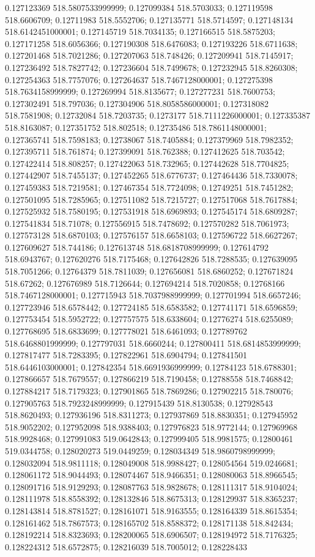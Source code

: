 0.127123369 518.5807533999999; 0.127099384 518.5703033; 0.127119598 518.6606709; 0.12711983 518.5552706; 0.127135771 518.5714597; 0.127148134 518.6142451000001; 0.127145719 518.7034135; 0.127166515 518.5875203; 0.127171258 518.6056366; 0.127190308 518.6476083; 0.127193226 518.6711638; 0.127201468 518.7021286; 0.127207063 518.748426; 0.127209941 518.7145917; 0.127236492 518.7827742; 0.127236604 518.7499678; 0.127232945 518.8260308; 0.127254363 518.7757076; 0.127264637 518.7467128000001; 0.127275398 518.7634158999999; 0.127269994 518.8135677; 0.127277231 518.7600753; 0.127302491 518.797036; 0.127304906 518.8058586000001; 0.127318082 518.7581908; 0.12732084 518.7203735; 0.1273177 518.7111226000001; 0.127335387 518.8163087; 0.127351752 518.802518; 0.12735486 518.7861148000001; 0.127365741 518.7598183; 0.12738067 518.7405884; 0.127379969 518.7982352; 0.127395711 518.761874; 0.127399091 518.762388; 0.127412625 518.703542; 0.127422414 518.808257; 0.127422063 518.732965; 0.127442628 518.7704825; 0.127442907 518.7455137; 0.127452265 518.6776737; 0.127464436 518.7330078; 0.127459383 518.7219581; 0.127467354 518.7724098; 0.12749251 518.7451282; 0.127501095 518.7285965; 0.127511082 518.7215727; 0.127517068 518.7617884; 0.127525932 518.7580195; 0.127531918 518.6969893; 0.127545174 518.6809287; 0.127541834 518.71078; 0.127556915 518.7478692; 0.127570282 518.7061973; 0.127573128 518.6870103; 0.127576157 518.6658103; 0.127596722 518.6627267; 0.127609627 518.744186; 0.127613748 518.6818708999999; 0.127614792 518.6943767; 0.127620276 518.7175468; 0.127642826 518.7288535; 0.127639095 518.7051266; 0.12764379 518.7811039; 0.127656081 518.6860252; 0.127671824 518.67262; 0.127676989 518.7126644; 0.127694214 518.7020858; 0.12768166 518.7467128000001; 0.127715943 518.7037988999999; 0.127701994 518.6657246; 0.127723946 518.6578442; 0.127724185 518.6583582; 0.127741171 518.6596859; 0.127753454 518.5952722; 0.127757575 518.6338604; 0.12776274 518.6255089; 0.127768695 518.6833699; 0.127778021 518.6461093; 0.127789762 518.6468801999999; 0.127797031 518.6660244; 0.127800411 518.6814853999999; 0.127817477 518.7283395; 0.127822961 518.6904794; 0.127841501 518.6446103000001; 0.127842354 518.6691936999999; 0.12784123 518.6788301; 0.127866657 518.7679557; 0.127866219 518.7190458; 0.12788558 518.7468842; 0.127884217 518.7179323; 0.127901865 518.7869286; 0.127902215 518.780076; 0.127905763 518.7923248999999; 0.127915439 518.8130538; 0.127928543 518.8620493; 0.127936196 518.8311273; 0.127937869 518.8830351; 0.127945952 518.9052202; 0.127952098 518.9388403; 0.127976823 518.9772144; 0.127969968 518.9928468; 0.127991083 519.0642843; 0.127999405 518.9981575; 0.12800461 519.0344758; 0.128020273 519.0449259; 0.128034349 518.9860798999999; 0.128032094 518.9811118; 0.128049008 518.9988427; 0.128054564 519.0246681; 0.128061172 518.9044493; 0.128074467 518.9466351; 0.128080063 518.8966545; 0.128091716 518.9129293; 0.128087763 518.9828678; 0.128111317 518.9104024; 0.128111978 518.8558392; 0.128132846 518.8675313; 0.128129937 518.8365237; 0.128143814 518.8781527; 0.128161071 518.9163555; 0.128164339 518.8615354; 0.128161462 518.7867573; 0.128165702 518.8588372; 0.128171138 518.842434; 0.128192214 518.8323693; 0.128200065 518.6906507; 0.128194972 518.7176325; 0.128224312 518.6572875; 0.128216039 518.7005012; 0.128228433 